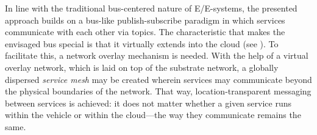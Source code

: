 In line with the traditional bus-centered nature of E/E-systems, the presented approach builds on a bus-like publish-subscribe paradigm in which services communicate with each other via topics. The characteristic that makes the envisaged bus special is that it virtually extends into the cloud (see ). To facilitate this, a network overlay mechanism \cite{tarkoma2010overlay} is needed. With the help of a virtual overlay network, which is laid on top of the substrate network, a globally dispersed \emph{service mesh} may be created wherein services may communicate beyond the physical boundaries of the network. That way, location-transparent messaging between services is achieved: it does not matter whether a given service runs within the vehicle or within the cloud---the way they communicate remains the same.





